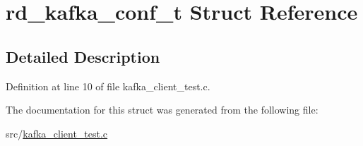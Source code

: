 \hypertarget{structrd__kafka__conf__t}{\section{rd\-\_\-kafka\-\_\-conf\-\_\-t \-Struct \-Reference}
\label{structrd__kafka__conf__t}
}


\subsection{\-Detailed \-Description}


\-Definition at line 10 of file kafka\-\_\-client\-\_\-test.\-c.



\-The documentation for this struct was generated from the following file\-:\begin{DoxyCompactItemize}
\item 
src/\hyperlink{kafka__client__test_8c}{kafka\-\_\-client\-\_\-test.\-c}\end{DoxyCompactItemize}
